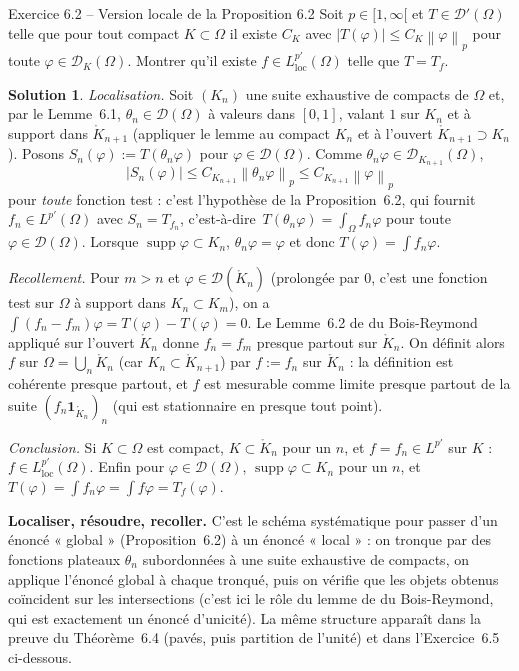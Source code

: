 \documentclass[11pt,a4paper]{article}
\newcommand{\interieur}[1]{\mathring{#1}}
\newcommand{\norm}[1]{\left\|#1\right\|}
\newcommand{\ie}{c'est-à-dire}
\DeclareMathOperator{\supp}{supp}
\newcommand{\D}{\mathcal{D}}
\theoremstyle{definition}
\newtheorem*{solution}{Solution}
\begin{document}
\begin{exo}{Exercice 6.2 -- Version locale de la Proposition 6.2}
Soit $p\in[1,\infty[$ et $T\in\D'(\Omega)$ telle que pour tout compact $K\subset\Omega$ il existe $C_K$ avec $|T(\varphi)|\le C_K\norm\varphi_p$ pour toute $\varphi\in\D_K(\Omega)$. Montrer qu'il existe $f\in L^{p'}_{\mathrm{loc}}(\Omega)$ telle que $T=T_f$.
\end{exo}

\begin{solution}
\emph{Localisation.} Soit $(K_n)$ une suite exhaustive de compacts de $\Omega$ et, par le Lemme~6.1, $\theta_n\in\D(\Omega)$ à valeurs dans $[0,1]$, valant $1$ sur $K_n$ et à support dans $\interieur K_{n+1}$ (appliquer le lemme au compact $K_n$ et à l'ouvert $\interieur K_{n+1}\supset K_n$). Posons $S_n(\varphi):=T(\theta_n\varphi)$ pour $\varphi\in\D(\Omega)$. Comme $\theta_n\varphi\in\D_{K_{n+1}}(\Omega)$,
\[
|S_n(\varphi)|\le C_{K_{n+1}}\norm{\theta_n\varphi}_p\le C_{K_{n+1}}\norm\varphi_p
\]
pour \emph{toute} fonction test : c'est l'hypothèse de la Proposition~6.2, qui fournit $f_n\in L^{p'}(\Omega)$ avec $S_n=T_{f_n}$, \ie\ $T(\theta_n\varphi)=\int_\Omega f_n\varphi$ pour toute $\varphi\in\D(\Omega)$. Lorsque $\supp\varphi\subset K_n$, $\theta_n\varphi=\varphi$ et donc $T(\varphi)=\int f_n\varphi$.

\emph{Recollement.} Pour $m>n$ et $\varphi\in\D(\interieur K_n)$ (prolongée par $0$, c'est une fonction test sur $\Omega$ à support dans $K_n\subset K_m$), on a $\int(f_n-f_m)\varphi=T(\varphi)-T(\varphi)=0$. Le Lemme~6.2 de du Bois-Reymond appliqué sur l'ouvert $\interieur K_n$ donne $f_n=f_m$ presque partout sur $\interieur K_n$. On définit alors $f$ sur $\Omega=\bigcup_n\interieur K_n$ (car $K_n\subset\interieur K_{n+1}$) par $f:=f_n$ sur $\interieur K_n$ : la définition est cohérente presque partout, et $f$ est mesurable comme limite presque partout de la suite $(f_n\mathbf 1_{\interieur K_n})_n$ (qui est stationnaire en presque tout point).

\emph{Conclusion.} Si $K\subset\Omega$ est compact, $K\subset\interieur K_n$ pour un $n$, et $f=f_n\in L^{p'}$ sur $K$ : $f\in L^{p'}_{\mathrm{loc}}(\Omega)$. Enfin pour $\varphi\in\D(\Omega)$, $\supp\varphi\subset K_n$ pour un $n$, et $T(\varphi)=\int f_n\varphi=\int f\varphi=T_f(\varphi)$.
\end{solution}

\begin{methode}
\textbf{Localiser, résoudre, recoller.} C'est le schéma systématique pour passer d'un énoncé « global » (Proposition~6.2) à un énoncé « local » : on tronque par des fonctions plateaux $\theta_n$ subordonnées à une suite exhaustive de compacts, on applique l'énoncé global à chaque tronqué, puis on vérifie que les objets obtenus coïncident sur les intersections (c'est ici le rôle du lemme de du Bois-Reymond, qui est exactement un énoncé d'unicité). La même structure apparaît dans la preuve du Théorème~6.4 (pavés, puis partition de l'unité) et dans l'Exercice~6.5 ci-dessous.
\end{methode}
\end{document}
